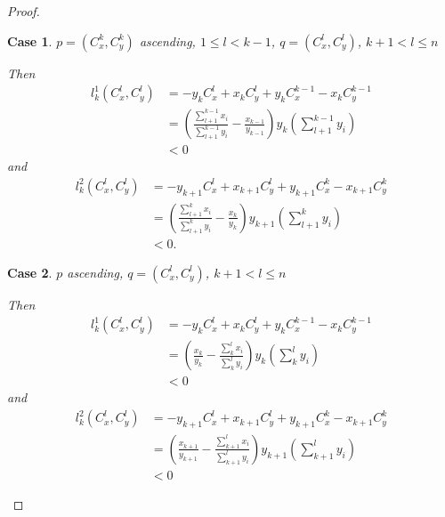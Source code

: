 \documentclass{article}
\theoremstyle{case}
\newtheorem{case}{Case}
\begin{document}
\begin{proof}
%
%
\begin{case} $p = \left( C_x^k, C_y^k \right)$ ascending, $1 \leq l < k-1$, $q = \left( C_x^l, C_y^l\right)$, $k+1 < l \leq n$

\noindent Then
\begin{align*}
l_k^1\left( C_x^l, C_y^l\right) &= -y_kC_x^l + x_kC_y^l + y_kC_x^{k-1} - x_kC_y^{k-1} \\
&= \left( \frac{\sum_{l+1}^{k-1} x_i}{\sum_{l+1}^{k-1} y_i} - \frac{x_{k-1}}{y_{k-1}}\right)y_k\left( \sum_{l+1}^{k-1} y_i\right) \\
&< 0
\end{align*}
and 
\begin{align*}
l_k^2\left(C_x^l, C_y^l\right) &= -y_{k+1}C_x^l + x_{k+1}C_y^l + y_{k+1}C_x^k - x_{k+1}C_y^k \\
&= \left( \frac{\sum_{l+1}^k x_i}{\sum_{l+1}^k y_i} - \frac{x_k}{y_k}\right) y_{k+1}\left(\sum_{l+1}^{k}y_i\right)\\
&< 0.
\end{align*}
\end{case} 

%
%
\begin{case} $p$ ascending, $q = \left( C_x^l, C_y^l\right)$, $k+1 < l \leq n$

\noindent Then
\begin{align*}
l_k^1\left( C_x^l, C_y^l\right) &= -y_kC_x^l + x_kC_y^l + y_kC_x^{k-1} - x_kC_y^{k-1} \\
&= \left( \frac{x_k}{y_k} - \frac{\sum_k^l x_i}{\sum_k^l y_i}\right)y_k\left( \sum_k^l y_i\right) \\
&< 0
\end{align*}
and
\begin{align*}
l_k^2\left(C_x^l, C_y^l\right) &= -y_{k+1}C_x^l + x_{k+1}C_y^l + y_{k+1}C_x^k - x_{k+1}C_y^k \\
&= \left( \frac{x_{k+1}}{y_{k+1}} - \frac{\sum_{k+1}^l x_i}{\sum_{k+1}^l y_i}\right)y_{k+1}\left( \sum_{k+1}^l y_i\right) \\
&< 0
\end{align*}
\end{case}


\end{proof}
\end{document}
